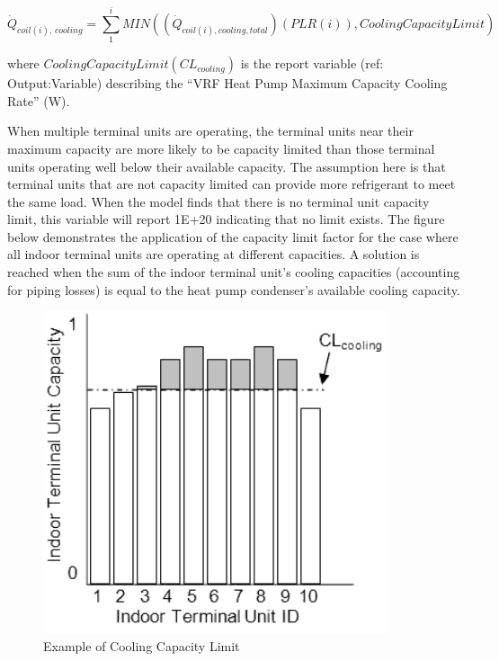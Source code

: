 \begin{equation}
  \dot{Q}_{coil(i),\,cooling} = \sum\limits_1^i MIN \left( \left( \dot{Q}_{coil(i),cooling,total} \right) \left( PLR(i) \right),CoolingCapacityLimit \right)
\end{equation}

where \(CoolingCapacityLimit(CL_{cooling})\) is the report variable (ref: Output:Variable) describing the ``VRF Heat Pump Maximum Capacity Cooling Rate'' (W).

When multiple terminal units are operating, the terminal units near their maximum capacity are more likely to be capacity limited than those terminal units operating well below their available capacity. The assumption here is that terminal units that are not capacity limited can provide more refrigerant to meet the same load. When the model finds that there is no terminal unit capacity limit, this variable will report 1E+20 indicating that no limit exists.  The figure below demonstrates the application of the capacity limit factor for the case where all indoor terminal units are operating at different capacities. A solution is reached when the sum of the indoor terminal unit's cooling capacities (accounting for piping losses) is equal to the heat pump condenser's available cooling capacity.

\begin{figure}[hbtp] %
\centering
\includegraphics[width=0.9\textwidth, height=0.9\textheight, keepaspectratio=true]{media/image5376.png}
\caption{Example of Cooling Capacity Limit \label{fig:example-of-cooling-capacity-limit}}
\end{figure}


